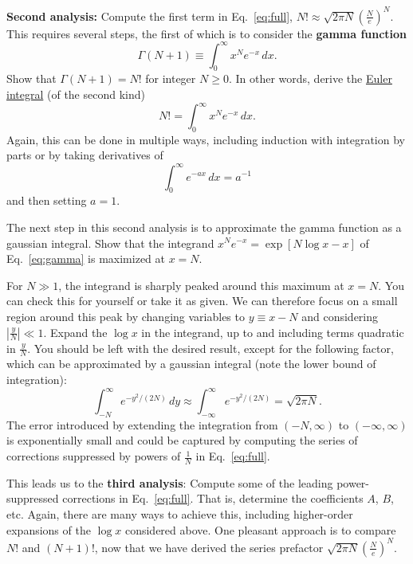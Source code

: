 \documentclass[12 pt]{article} %
\newcommand{\Ga}{\ensuremath{\Gamma} }
\newcommand{\eq}[1]{Eq.~\ref{#1}}
\begin{document}
\textbf{Second analysis:} Compute the first term in \eq{eq:full}, $N! \approx \sqrt{2\pi N} \left(\frac{N}{e}\right)^N$.
This requires several steps, the first of which is to consider the \textbf{gamma function}
\begin{equation*}
  \Ga(N + 1) \equiv \int_0^{\infty} x^N e^{-x} \, dx.
\end{equation*}
Show that $\Ga(N + 1) = N!$ for integer $N \geq 0$.
In other words, derive the \href{https://en.wikipedia.org/wiki/Euler_integral}{Euler integral} (of the second kind)
\begin{equation}
  \label{eq:gamma}
  N! = \int_0^{\infty} x^N e^{-x} \, dx.
\end{equation}
Again, this can be done in multiple ways, including induction with integration by parts or by taking derivatives of
\begin{equation*}
  \int_0^{\infty} e^{-ax} \, dx = a^{-1}
\end{equation*}
and then setting $a = 1$.

\newpage
The next step in this second analysis is to approximate the gamma function as a gaussian integral.
Show that the integrand $x^N e^{-x} = \exp\left[N\log x - x\right]$ of \eq{eq:gamma} is maximized at $x = N$.

For $N \gg 1$, the integrand is sharply peaked around this maximum at $x = N$.
You can check this for yourself or take it as given.
We can therefore focus on a small region around this peak by changing variables to $y \equiv x - N$ and considering $\left|\frac{y}{N}\right| \ll 1$.
Expand the $\log x$ in the integrand, up to and including terms quadratic in $\frac{y}{N}$.
You should be left with the desired result, except for the following factor, which can be approximated by a gaussian integral (note the lower bound of integration):
\begin{equation*}
  \int_{-N}^{\infty} e^{-y^2 / (2N)} \, dy \approx \int_{-\infty}^{\infty} e^{-y^2 / (2N)} = \sqrt{2\pi N}.
\end{equation*}
The error introduced by extending the integration from $(-N, \infty)$ to  $(-\infty, \infty)$ is exponentially small and could be captured by computing the series of corrections suppressed by powers of $\frac{1}{N}$ in \eq{eq:full}.

This leads us to the \textbf{third analysis}: Compute some of the leading power-suppressed corrections in \eq{eq:full}.
That is, determine the coefficients $A$, $B$, etc.
Again, there are many ways to achieve this, including higher-order expansions of the $\log x$ considered above.
One pleasant approach is to compare $N!$ and $(N + 1)!$, now that we have derived the series prefactor $\sqrt{2\pi N} \left(\frac{N}{e}\right)^N$.
\end{document}
